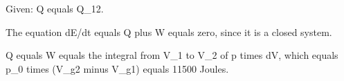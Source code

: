 Given: Q equals Q_12.

The equation dE/dt equals Q plus W equals zero, since it is a closed system.

Q equals W equals the integral from V_1 to V_2 of p times dV, which equals p_0 times (V_g2 minus V_g1) equals 11500 Joules.